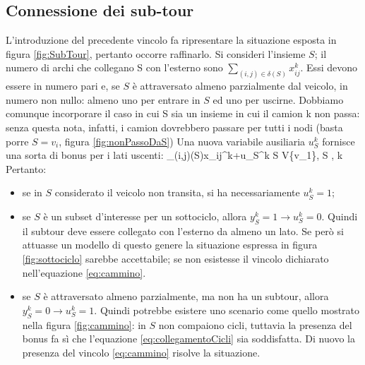 \subsection{Connessione dei sub-tour}
	L'introduzione del precedente vincolo fa ripresentare la situazione esposta in figura \ref{fig:SubTour}, pertanto occorre raffinarlo.
	Si consideri l'insieme $S$; il numero di archi che collegano S con l'esterno sono $\sum_{(i,j)\in \delta(S)}{x_{ij}^{k}}$.
	Essi devono essere in numero pari e, se $S$ è attraversato almeno parzialmente dal veicolo, in numero non nullo: 
	almeno uno per entrare in $S$ ed uno per uscirne. Dobbiamo comunque incorporare il caso in cui S sia un insieme in cui il camion k
	non passa: senza questa nota, infatti, i camion dovrebbero passare per tutti i nodi (basta porre $S=v_i$, figura \ref{fig:nonPassoDaS})
	Una nuova variabile ausiliaria $u_S^k$ fornisce una sorta di bonus per i lati uscenti:
		{\sum_{(i,j)\in \delta(S)}{x_{ij}^{k}+u_S^k}  \;\;\;\;\; S \subseteq V{\setminus}\{v_1\},\; S \neq \emptyset,\; k \in [1;K]}
	Pertanto:
	\begin{itemize}
	  \item se in $S$ considerato il veicolo non transita, si ha necessariamente $u_S^k=1$;
	  \item se $S$ è un subset d'interesse per un sottociclo, allora $y_S^k=1 \rightarrow u_S^k=0$.
	  	Quindi il subtour deve essere collegato con l'esterno da almeno un lato. Se però si attuasse
	  	un modello di questo genere la situazione espressa in figura \ref{fig:sottociclo} sarebbe accettabile;
	  	se non esistesse il vincolo dichiarato nell'equazione \ref{eq:cammino}.
	  \item se $S$ è attraversato almeno parzialmente, ma non ha un subtour, allora $y_S^k=0 \rightarrow u_S^k=1$.
	  	Quindi potrebbe esistere uno scenario come quello mostrato nella figura \ref{fig:cammino}: in $S$ non compaiono
	  	cicli, tuttavia la presenza del bonus fa sì che l'equazione \ref{eq:collegamentoCicli} sia soddisfatta.
	  	Di nuovo la presenza del vincolo \ref{eq:cammino} risolve la situazione.  
	\end{itemize}


